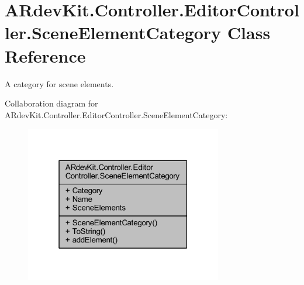 \hypertarget{class_a_rdev_kit_1_1_controller_1_1_editor_controller_1_1_scene_element_category}{\section{A\-Rdev\-Kit.\-Controller.\-Editor\-Controller.\-Scene\-Element\-Category Class Reference}
\label{class_a_rdev_kit_1_1_controller_1_1_editor_controller_1_1_scene_element_category}
}


A category for scene elements.  




Collaboration diagram for A\-Rdev\-Kit.\-Controller.\-Editor\-Controller.\-Scene\-Element\-Category\-:
\nopagebreak
\begin{figure}[H]
\begin{center}
\leavevmode
\includegraphics[width=244pt]{class_a_rdev_kit_1_1_controller_1_1_editor_controller_1_1_scene_element_category__coll__graph}
\end{center}
\end{figure}
